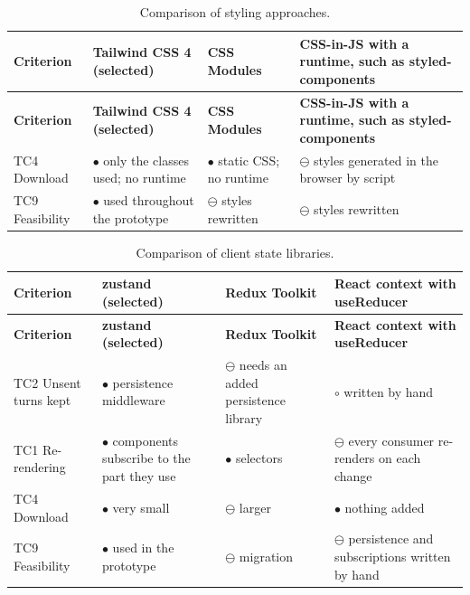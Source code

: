 {\small{}\renewcommand{\arraystretch}{1.1}
\begin{longtable}{|>{\raggedright\arraybackslash}p{}|>{\raggedright\arraybackslash}p{}|>{\raggedright\arraybackslash}p{}|>{\raggedright\arraybackslash}p{}|}
\caption{Comparison of styling approaches.} \\
\hline
\textbf{Criterion} & \textbf{Tailwind CSS 4 (selected)} & \textbf{CSS Modules\cite{r172}} & \textbf{CSS-in-JS with a runtime, such as styled-\allowbreak{}components\cite{r173}} \\ \hline
\endfirsthead
\hline
\textbf{Criterion} & \textbf{Tailwind CSS 4 (selected)} & \textbf{CSS Modules\cite{r172}} & \textbf{CSS-in-JS with a runtime, such as styled-\allowbreak{}components\cite{r173}} \\ \hline
\endhead
TC4 Download & $\bullet$ only the classes used; no runtime\cite{r141} & $\bullet$ static CSS; no runtime & $\ominus$ styles generated in the browser by script \\ \hline
TC9 Feasibility & $\bullet$ used throughout the prototype & $\ominus$ styles rewritten & $\ominus$ styles rewritten \\ \hline
\end{longtable}
}

{\small{}\renewcommand{\arraystretch}{1.1}
\begin{longtable}{|>{\raggedright\arraybackslash}p{}|>{\raggedright\arraybackslash}p{}|>{\raggedright\arraybackslash}p{}|>{\raggedright\arraybackslash}p{}|}
\caption{Comparison of client state libraries.} \\
\hline
\textbf{Criterion} & \textbf{zustand (selected)} & \textbf{Redux Toolkit\cite{r174}} & \textbf{React context with useReducer} \\ \hline
\endfirsthead
\hline
\textbf{Criterion} & \textbf{zustand (selected)} & \textbf{Redux Toolkit\cite{r174}} & \textbf{React context with useReducer} \\ \hline
\endhead
TC2 Unsent turns kept & $\bullet$ persistence middleware\cite{r142} & $\ominus$ needs an added persistence library & $\circ$ written by hand \\ \hline
TC1 Re-\allowbreak{}rendering & $\bullet$ components subscribe to the part they use & $\bullet$ selectors & $\ominus$ every consumer re-renders on each change \\ \hline
TC4 Download & $\bullet$ very small & $\ominus$ larger & $\bullet$ nothing added \\ \hline
TC9 Feasibility & $\bullet$ used in the prototype & $\ominus$ migration & $\ominus$ persistence and subscriptions written by hand \\ \hline
\end{longtable}
}

